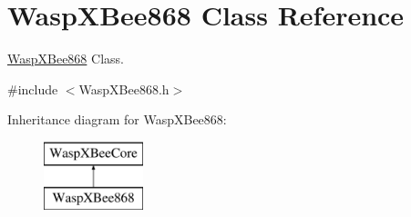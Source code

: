 \hypertarget{class_wasp_x_bee868}{}\section{Wasp\+X\+Bee868 Class Reference}
\label{class_wasp_x_bee868}


\hyperlink{class_wasp_x_bee868}{Wasp\+X\+Bee868} Class.  




{\ttfamily \#include $<$Wasp\+X\+Bee868.\+h$>$}

Inheritance diagram for Wasp\+X\+Bee868\+:\begin{figure}[H]
\begin{center}
\leavevmode
\includegraphics[height=2.000000cm]{class_wasp_x_bee868}
\end{center}
\end{figure}

